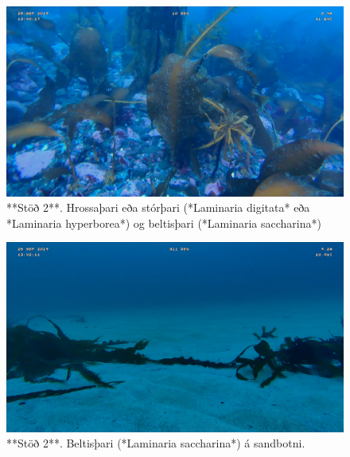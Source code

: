 \documentclass[icelandic,]{book}
\begin{document}
\begin{figure}

{\centering \includegraphics[width=1\linewidth]{skjol/skogar/sk6/stodvar/st3/sk6-st3} 

}

\caption{**Stöð 2**. Hrossaþari eða stórþari (*Laminaria digitata* eða *Laminaria hyperborea*) og beltisþari (*Laminaria saccharina*)}\label{fig:mynd-sk-sex-stod-thrju}
\end{figure}

\begin{figure}

{\centering \includegraphics[width=1\linewidth]{skjol/skogar/sk6/stodvar/st3/sk6-st3B} 

}

\caption{**Stöð 2**. Beltisþari (*Laminaria saccharina*) á sandbotni.}\label{fig:mynd-sk-sex-stod-thrjuB}
\end{figure}
\end{document}
